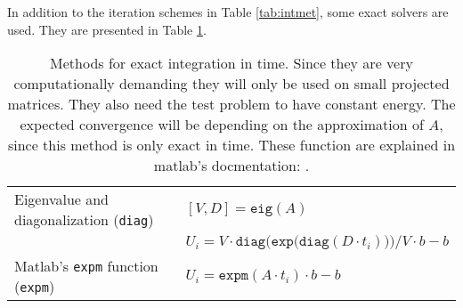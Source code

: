 \noindent In addition to the iteration schemes in Table \ref{tab:intmet}, some exact solvers are used. They are presented in Table \ref{tab:intcorrect}.
\begin{table}

\caption{Methods for exact integration in time. Since they are very computationally demanding they will only be used on small projected matrices. They also need the test problem to have constant energy. The expected convergence will be depending on the approximation of $A$, since this method is only exact in time. These function are explained in matlab's docmentation: \cite{expm}. }

\begin{tabular}{l l}
Eigenvalue and diagonalization (\texttt{diag}) & $[V,D] = \texttt{eig}(A)$ \\
 & $U_i = V \cdot \texttt{diag} \Big( \texttt{exp} \big( \texttt{diag}(D \cdot t_i)\big)\Big)/V \cdot b - b$ \\
Matlab's \texttt{expm} function (\texttt{expm}) & $U_i = \texttt{expm}(A \cdot t_i) \cdot b - b$ \\

\end{tabular}

\label{tab:intcorrect} 
\end{table}

